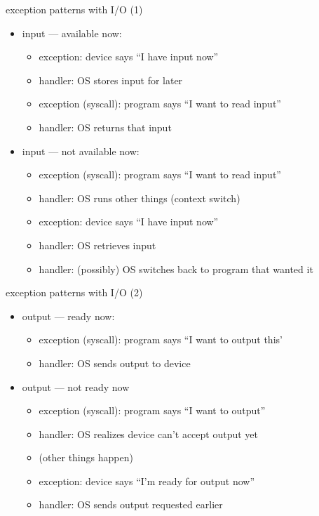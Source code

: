 \begin{frame}{exception patterns with I/O (1)}
    \begin{itemize}
    \item input --- available now:
        \begin{itemize}
        \item exception: device says ``I have input now''
        \item handler: OS stores input for later
        \item exception (syscall): program says ``I want to read input''
        \item handler: OS returns that input
        \end{itemize}
    \item input --- not available now:
        \begin{itemize}
        \item exception (syscall): program says ``I want to read input''
        \item handler: OS runs other things (context switch)
        \item exception: device says ``I have input now''
        \item handler: OS retrieves input
        \item handler: (possibly) OS switches back to program that wanted it
        \end{itemize}
    \end{itemize}
\end{frame}

\begin{frame}{exception patterns with I/O (2)}
    \begin{itemize}
    \item output --- ready now:
        \begin{itemize}
        \item exception (syscall): program says ``I want to output this'
        \item handler: OS sends output to device
        \end{itemize}
    \item output --- not ready now
        \begin{itemize}
        \item exception (syscall): program says ``I want to output''
        \item handler: OS realizes device can't accept output yet
        \item (other things happen)
        \item exception: device says ``I'm ready for output now''
        \item handler: OS sends output requested earlier
        \end{itemize}
    \end{itemize}
\end{frame}
